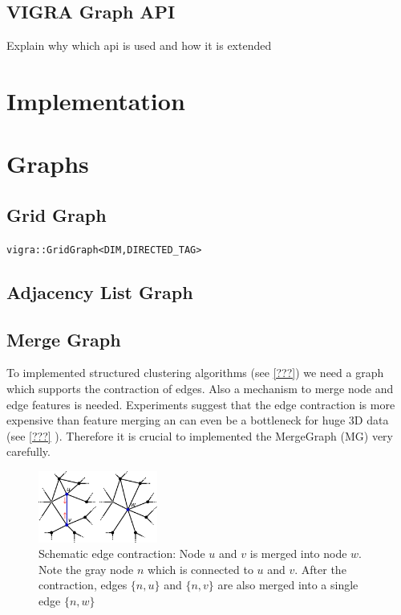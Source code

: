 \subsection{VIGRA Graph API}
Explain why which api is used and how it is extended



\section{Implementation}\label{sec:vigra_graph_lib_impl}



\section{Graphs}


\subsection{Grid Graph}


    \lstinline{vigra::GridGraph<DIM,DIRECTED_TAG>}

\subsection{Adjacency List Graph}

\subsection{Merge Graph}
To implemented structured clustering algorithms (see \cref{???}) we
need a graph which supports the contraction of edges.
Also a mechanism to merge node and edge features is needed.
Experiments suggest that the edge contraction is more expensive
than feature merging an can even be a bottleneck for huge 3D data 
(see \cref{???} ).
Therefore it is crucial to implemented the MergeGraph (MG) very carefully.
\begin{figure}
    \centering
    \includegraphics[width=0.35\textwidth]{fig/contraction.pdf}
    \caption{ Schematic edge contraction: Node $u$ and $v$ is merged into node $w$.
        Note the gray node $n$ which is connected to $u$ and $v$.
        After the contraction, edges $\{ n,u\}$ and $\{ n,v\}$ are also merged into 
        a single edge $\{ n, w\}$ 
    }
    \label{fig:figlabel}
\end{figure}


